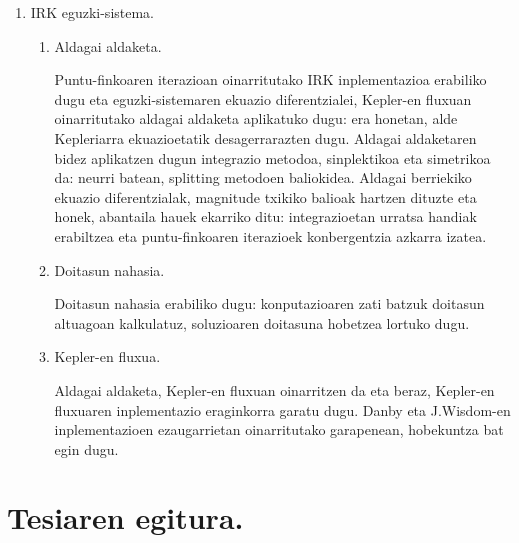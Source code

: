 \begin{enumerate}
\item IRK eguzki-sistema.

\begin{enumerate}
\item Aldagai aldaketa.

Puntu-finkoaren iterazioan oinarritutako IRK inplementazioa erabiliko dugu eta eguzki-sistemaren ekuazio diferentzialei, Kepler-en fluxuan oinarritutako aldagai aldaketa aplikatuko dugu: era honetan, alde Kepleriarra ekuazioetatik desagerrarazten dugu.
Aldagai aldaketaren bidez aplikatzen dugun integrazio metodoa, sinplektikoa eta simetrikoa da: neurri batean, splitting metodoen baliokidea. Aldagai berriekiko ekuazio diferentzialak, magnitude txikiko balioak hartzen dituzte eta honek, abantaila hauek ekarriko ditu: integrazioetan urratsa handiak erabiltzea eta puntu-finkoaren iterazioek konbergentzia azkarra izatea.

\item Doitasun nahasia.

Doitasun nahasia erabiliko dugu: konputazioaren zati batzuk doitasun altuagoan kalkulatuz, soluzioaren doitasuna hobetzea lortuko dugu.    

\item Kepler-en fluxua.

Aldagai aldaketa, Kepler-en fluxuan oinarritzen da eta beraz, Kepler-en fluxuaren inplementazio eraginkorra garatu dugu. Danby \cite{Danby1992} eta J.Wisdom-en \cite{Wisdom2015} inplementazioen ezaugarrietan oinarritutako garapenean, hobekuntza bat egin dugu.  
\end{enumerate}







\end{enumerate}        


\section{Tesiaren egitura.}


